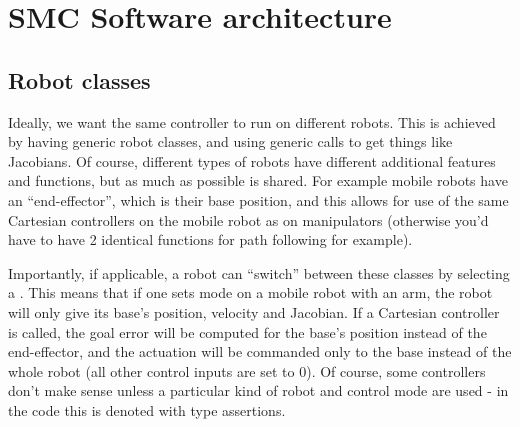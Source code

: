 \chapter{SMC Software architecture}
\section{Robot classes}
Ideally, we want the same controller to run on different robots.
This is achieved by having generic robot classes,
and using generic calls to get things like Jacobians.
Of course, different types of robots have different additional
features and functions, but as much as possible is shared.
For example mobile robots have an ``end-effector'',
which is their base position, and this allows for 
use of the same Cartesian controllers on the mobile robot
as on manipulators (otherwise you'd have to have 2 identical functions
for path following for example).

Importantly, if applicable, a robot can ``switch'' between 
these classes by selecting a .
This means that if one sets  mode
on a mobile robot with an arm, the robot will only give
its base's position, velocity and Jacobian. If a Cartesian controller
is called, the goal error will be computed for the base's position
instead of the end-effector, and the actuation will be commanded
only to the base instead of the whole robot (all other control inputs
are set to 0).
Of course, some controllers don't make sense unless a particular
kind of robot and control mode are used - in the code this is denoted
with type assertions.

